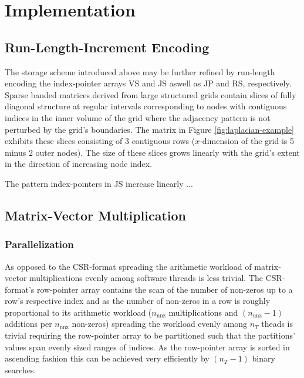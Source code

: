 \chapter{Implementation}

  \section{Run-Length-Increment Encoding}


    The storage scheme introduced above may be further refined by run-length encoding the index-pointer arrays VS and
    JS aswell as JP and RS, respectively. Sparse banded matrices derived from large structured grids contain slices of
    fully diagonal structure at regular intervals corresponding to nodes with contiguous indices in the inner volume
    of the grid where the adjacency pattern is not perturbed by the grid's boundaries. The matrix in Figure
    \ref{fig:laplacian-example} exhibits these slices consisting of 3 contiguous rows ($x$-dimension of the grid is 5
    minus 2 outer nodes). The size of these slices grows linearly with the grid's extent in the direction of
    increasing node index.

    The pattern index-pointers in JS increase linearly ...

  \section{Matrix-Vector Multiplication}

    \subsection{Parallelization}

      As opposed to the CSR-format spreading the arithmetic workload of matrix-vector multiplications evenly among
      software threads is less trivial. The CSR-format's row-pointer array contains the scan of the number of non-zeros
      up to a row's respective index and as the number of non-zeros in a row is roughly proportional to its arithmetic
      workload ($n_\text{nnz}$ multiplications and $(n_\text{nnz} - 1)$ additions per $n_\text{nnz}$ non-zeros)
      spreading the workload evenly among $n_T$ theads is trivial requiring the row-pointer array to be partitioned such
      that the partitions' values span evenly sized ranges of indices. As the row-pointer array is sorted in ascending
      fashion this can be achieved very efficiently by $(n_T - 1)$ binary searches.

